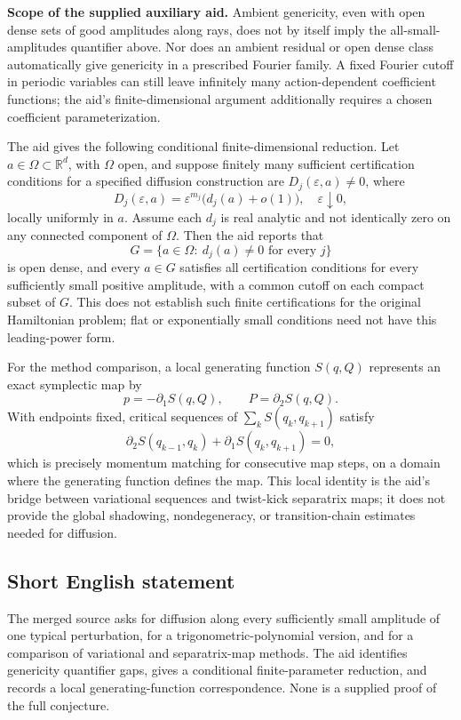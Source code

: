 \documentclass[11pt]{article}
\newcommand{\R}{\mathbb{R}}
\begin{document}
\textbf{Scope of the supplied auxiliary aid.} Ambient genericity, even with open dense sets of good amplitudes along rays, does not by itself imply the all-small-amplitudes quantifier above. Nor does an ambient residual or open dense class automatically give genericity in a prescribed Fourier family. A fixed Fourier cutoff in periodic variables can still leave infinitely many action-dependent coefficient functions; the aid's finite-dimensional argument additionally requires a chosen coefficient parameterization.

The aid gives the following conditional finite-dimensional reduction. Let \(a\in\Omega\subset\R^d\), with \(\Omega\) open, and suppose finitely many sufficient certification conditions for a specified diffusion construction are \(D_j(\varepsilon,a)\ne0\), where
\[
 D_j(\varepsilon,a)=\varepsilon^{m_j}\bigl(d_j(a)+o(1)\bigr),
 \quad\varepsilon\downarrow0,
\]
locally uniformly in \(a\). Assume each \(d_j\) is real analytic and not identically zero on any connected component of \(\Omega\). Then the aid reports that
\[
 G=\{a\in\Omega:\ d_j(a)\ne0\text{ for every }j\}
\]
is open dense, and every \(a\in G\) satisfies all certification conditions for every sufficiently small positive amplitude, with a common cutoff on each compact subset of \(G\). This does not establish such finite certifications for the original Hamiltonian problem; flat or exponentially small conditions need not have this leading-power form.

For the method comparison, a local generating function \(S(q,Q)\) represents an exact symplectic map by
\[
 p=-\partial_1S(q,Q),\qquad P=\partial_2S(q,Q).
\]
With endpoints fixed, critical sequences of \(\sum_k S(q_k,q_{k+1})\) satisfy
\[
 \partial_2S(q_{k-1},q_k)+\partial_1S(q_k,q_{k+1})=0,
\]
which is precisely momentum matching for consecutive map steps, on a domain where the generating function defines the map. This local identity is the aid's bridge between variational sequences and twist-kick separatrix maps; it does not provide the global shadowing, nondegeneracy, or transition-chain estimates needed for diffusion.
\subsection{Short English statement}
The merged source asks for diffusion along every sufficiently small amplitude of one typical perturbation, for a trigonometric-polynomial version, and for a comparison of variational and separatrix-map methods. The aid identifies genericity quantifier gaps, gives a conditional finite-parameter reduction, and records a local generating-function correspondence. None is a supplied proof of the full conjecture.
\end{document}
